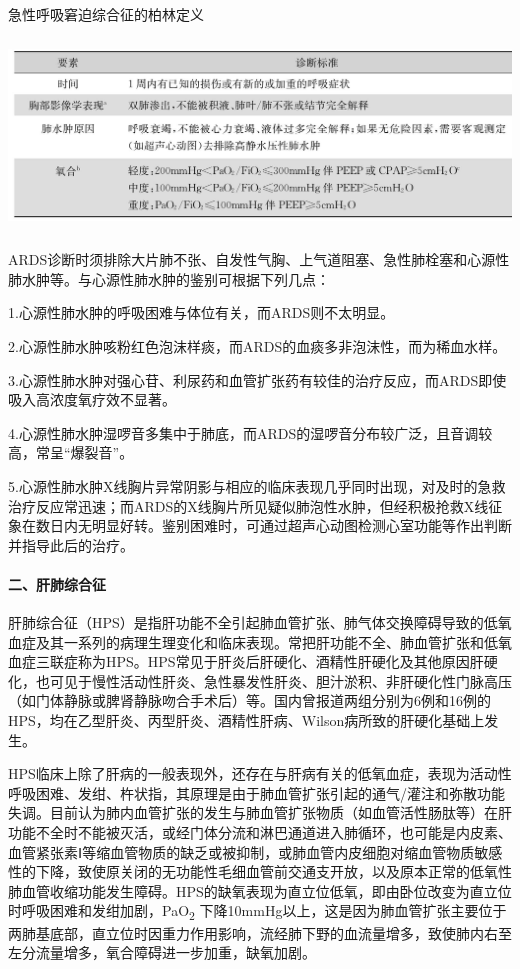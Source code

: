 \begin{table}[htbp]
\centering
\caption{急性呼吸窘迫综合征的柏林定义}
\label{tab3-5}
\includegraphics[width=5.89583in,height=2.01042in]{./images/Image00036.jpg}
\end{table}

ARDS诊断时须排除大片肺不张、自发性气胸、上气道阻塞、急性肺栓塞和心源性肺水肿等。与心源性肺水肿的鉴别可根据下列几点：

1.心源性肺水肿的呼吸困难与体位有关，而ARDS则不太明显。

2.心源性肺水肿咳粉红色泡沫样痰，而ARDS的血痰多非泡沫性，而为稀血水样。

3.心源性肺水肿对强心苷、利尿药和血管扩张药有较佳的治疗反应，而ARDS即使吸入高浓度氧疗效不显著。

4.心源性肺水肿湿啰音多集中于肺底，而ARDS的湿啰音分布较广泛，且音调较高，常呈“爆裂音”。

5.心源性肺水肿X线胸片异常阴影与相应的临床表现几乎同时出现，对及时的急救治疗反应常迅速；而ARDS的X线胸片所见疑似肺泡性水肿，但经积极抢救X线征象在数日内无明显好转。鉴别困难时，可通过超声心动图检测心室功能等作出判断并指导此后的治疗。

\paragraph{二、肝肺综合征}

肝肺综合征（HPS）是指肝功能不全引起肺血管扩张、肺气体交换障碍导致的低氧血症及其一系列的病理生理变化和临床表现。常把肝功能不全、肺血管扩张和低氧血症三联症称为HPS。HPS常见于肝炎后肝硬化、酒精性肝硬化及其他原因肝硬化，也可见于慢性活动性肝炎、急性暴发性肝炎、胆汁淤积、非肝硬化性门脉高压（如门体静脉或脾肾静脉吻合手术后）等。国内曾报道两组分别为6例和16例的HPS，均在乙型肝炎、丙型肝炎、酒精性肝病、Wilson病所致的肝硬化基础上发生。

HPS临床上除了肝病的一般表现外，还存在与肝病有关的低氧血症，表现为活动性呼吸困难、发绀、杵状指，其原理是由于肺血管扩张引起的通气/灌注和弥散功能失调。目前认为肺内血管扩张的发生与肺血管扩张物质（如血管活性肠肽等）在肝功能不全时不能被灭活，或经门体分流和淋巴通道进入肺循环，也可能是内皮素、血管紧张素Ⅰ等缩血管物质的缺乏或被抑制，或肺血管内皮细胞对缩血管物质敏感性的下降，致使原关闭的无功能性毛细血管前交通支开放，以及原本正常的低氧性肺血管收缩功能发生障碍。HPS的缺氧表现为直立位低氧，即由卧位改变为直立位时呼吸困难和发绀加剧，PaO\textsubscript{2}
下降10mmHg以上，这是因为肺血管扩张主要位于两肺基底部，直立位时因重力作用影响，流经肺下野的血流量增多，致使肺内右至左分流量增多，氧合障碍进一步加重，缺氧加剧。

